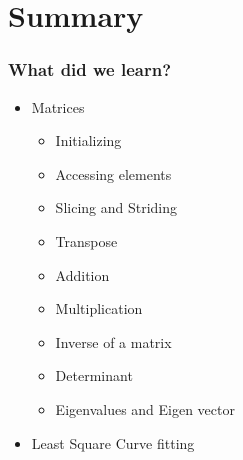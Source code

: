 \documentclass[14pt,compress]{beamer}
\begin{document}
\section{Summary}
\begin{frame}
  \frametitle{What did we learn?}
  \begin{itemize}
  \item Matrices
    \begin{itemize}
      \item Initializing
      \item Accessing elements
      \item Slicing and Striding
      \item Transpose
      \item Addition
      \item Multiplication
      \item Inverse of a matrix
      \item Determinant
      \item Eigenvalues and Eigen vector
    \end{itemize}
  \item Least Square Curve fitting
  \end{itemize}
\end{frame}
\end{document}
